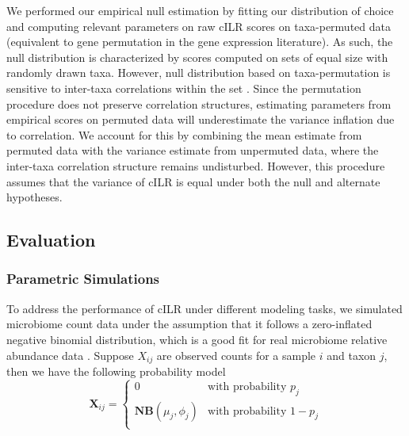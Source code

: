 \documentclass{article}
\begin{document}
We performed our empirical null estimation by fitting our distribution of choice and computing relevant parameters on raw cILR scores on taxa-permuted data (equivalent to gene permutation in the gene expression literature). As such, the null distribution is characterized by scores computed on sets of equal size with randomly drawn taxa. However, null distribution based on taxa-permutation is sensitive to inter-taxa correlations within the set \cite{wu2012}. Since the permutation procedure does not preserve correlation structures, estimating parameters from empirical scores on permuted data will underestimate the variance inflation due to correlation. We account for this by combining the mean estimate from permuted data with the variance estimate from unpermuted data, where the inter-taxa correlation structure remains undisturbed. However, this procedure assumes that the variance of cILR is equal under both the null and alternate hypotheses. 

\subsection*{Evaluation}
\subsubsection*{Parametric Simulations}  
To address the performance of cILR under different modeling tasks, we simulated microbiome count data under the assumption that it follows a zero-inflated negative binomial distribution, which is a good fit for real microbiome relative abundance data \cite{calgaro2020}. Suppose $X_{ij}$ are observed counts for a sample $i$ and taxon $j$, then we have the following probability model
\begin{equation}
    \mathbf{X}_{ij} =
      \begin{cases}
        0 & \text{with probability $p_j$}\\
        \mathbf{NB}(\mu_j, \phi_j) & \text{with probability $1 - p_j$}\\
      \end{cases}       
\end{equation}
\end{document}
